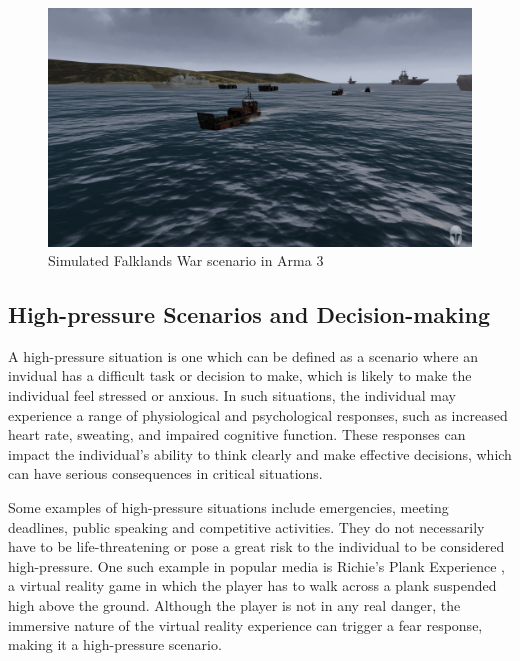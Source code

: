 \documentclass[12pt]{article}
\begin{document}
\begin{figure}[h]
  \centering
  \begin{minipage}[b]{0.9\linewidth}
    \includegraphics[width=\linewidth]{images/falklands-arma.jpg}
    \caption{Simulated Falklands War scenario in Arma 3}
    \label{fig:falklandsarma}
  \end{minipage}
\end{figure}

\subsection{High-pressure Scenarios and Decision-making}

A high-pressure situation is one which can be defined as a scenario where an invidual has a difficult task or decision to make, which is likely to make the individual feel stressed or anxious. In such situations, the individual may experience a range of physiological and psychological responses, such as increased heart rate, sweating, and impaired cognitive function. These responses can impact the individual's ability to think clearly and make effective decisions, which can have serious consequences in critical situations.

Some examples of high-pressure situations include emergencies, meeting deadlines, public speaking and competitive activities. They do not necessarily have to be life-threatening or pose a great risk to the individual to be considered high-pressure. One such example in popular media is Richie's Plank Experience \cite{richiesplank}, a virtual reality game in which the player has to walk across a plank suspended high above the ground. Although the player is not in any real danger, the immersive nature of the virtual reality experience can trigger a fear response, making it a high-pressure scenario. \cite{el2023walk}
\end{document}
